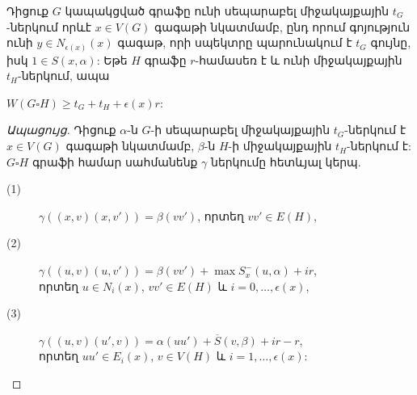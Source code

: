 \begin{theorem}
\label{t2_separable}
Դիցուք $G$ կապակցված գրաֆը ունի սեպարաբել միջակայքային $t_G$-ներկում որևէ $x\in V(G)$ գագաթի նկատմամբ, ընդ որում գոյություն ունի $y\in N_{\epsilon(x)}(x)$ գագաթ, որի սպեկտրը պարունակում է $t_G$ գույնը, իսկ $1\in S(x,\alpha)$: Եթե $H$ գրաֆը $r$-համասեռ է և ունի միջակայքային $t_H$-ներկում, ապա
\begin{center}
$W(G \square H) \geq t_G + t_H + \epsilon(x)r$:
\end{center}
\end{theorem}
\begin{proof}[Ապացույց]
Դիցուք $\alpha$-ն $G$-ի սեպարաբել միջակայքային $t_G$-ներկում է $x \in V(G)$ գագաթի նկատմամբ, $\beta$-ն $H$-ի միջակայքային $t_H$-ներկում է: $G \square H$ գրաֆի համար սահմանենք $\gamma$ ներկումը հետևյալ կերպ.

\begin{description}
\item[(1)] $\gamma((x,v)(x,v')) = \beta(vv')$, որտեղ $vv' \in E(H)$,
\item[(2)] $\gamma((u,v)(u,v')) = \beta(vv') + \max{S_x^-(u,\alpha)} + i r$,\\ որտեղ $u\in N_i(x)$, $vv' \in E(H)$ և $i=0,\dots,\epsilon(x)$,
\item[(3)] $\gamma((u,v)(u',v)) = \alpha(uu') + \overline{S}(v,\beta) + i r - r$,\\ որտեղ $uu'\in E_i(x)$, $v \in V(H)$ և $i=1,\dots,\epsilon(x)$:
\end{description}

\begin{hide}
\begin{figure}[t!]
\centering
{}
\end{figure}
\end{hide}
\end{proof}
